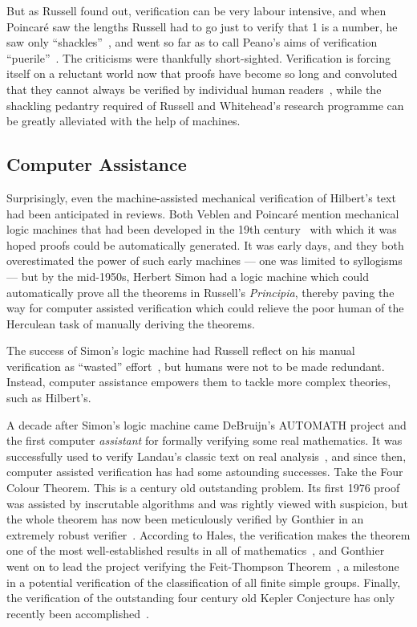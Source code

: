 But as Russell found out, verification can be very labour intensive, and when Poincar\'{e} saw the lengths Russell had to go just to verify that 1 is a number, he saw only ``shackles''~\cite{PoincareShackles}, and went so far as to call Peano's aims of verification ``puerile''~\cite{PoincareReview}. The criticisms were thankfully short-sighted. Verification is forcing itself on a reluctant world now that proofs have become so long and convoluted that they cannot always be verified by individual human readers~\cite{WhitherMathematics}, while the shackling pedantry required of Russell and Whitehead's research programme can be greatly alleviated with the help of machines.

\subsection{Computer Assistance}
Surprisingly, even the machine-assisted mechanical verification of Hilbert's text had been anticipated in reviews. Both Veblen and Poincar\'{e} mention mechanical logic machines that had been developed in the 19th century~\cite{LogicMachines} with which it was hoped proofs could be automatically generated. It was early days, and they both overestimated the power of such early machines --- one was limited to syllogisms --- but by the mid-1950s, Herbert Simon had a logic machine which could automatically prove all the theorems in Russell's \emph{Principia}, thereby paving the way for computer assisted verification which could relieve the poor human of the Herculean task of manually deriving the theorems. 

The success of Simon's logic machine had Russell reflect on his manual verification as ``wasted'' effort~\cite{SimonObituary}, but humans were not to be made redundant. Instead, computer assistance empowers them to tackle more complex theories, such as Hilbert's.

A decade after Simon's logic machine came DeBruijn's AUTOMATH project and the first computer \emph{assistant} for formally verifying some real mathematics. It was successfully used to verify Landau's classic text on real analysis~\cite{LandauGrundlagen,LandauAUTOMATH}, and since then, computer assisted verification has had some astounding successes. Take the Four Colour Theorem. This is a century old outstanding problem. Its first 1976 proof was assisted by inscrutable algorithms and was rightly viewed with suspicion, but the whole theorem has now been meticulously verified by Gonthier in an extremely robust verifier~\cite{GonthierFCT}. According to Hales, the verification makes the theorem one of the most well-established results in all of mathematics~\cite{HalesFormalProof}, and Gonthier went on to lead the project verifying the Feit-Thompson Theorem~\cite{FeitThompson}, a milestone in a potential verification of the classification of all finite simple groups. Finally, the verification of the outstanding four century old Kepler Conjecture has only recently been accomplished~\cite{flyspeck}. 

